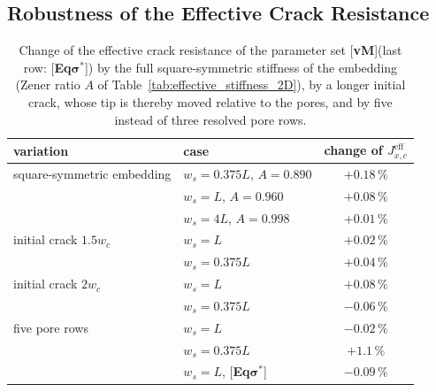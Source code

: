 \documentclass[pdflatex,sn-mathphys-num]{sn-jnl}%
\newcommand{\vMLabel}{[\textbf{vM}]\xspace}
\newcommand{\EqSigmaStarLabel}{[\textbf{Eq$\boldsymbol{\sigma^*}$}]\xspace}
\theoremstyle{thmstyleone}%
\theoremstyle{thmstyletwo}%
\theoremstyle{thmstylethree}%
\begin{document}
\subsection{Robustness of the Effective Crack Resistance}
\label{sec:2D_cubic_embedding}\label{sec:2D_representativity}

\begin{table}[htb]
\centering
\caption{Change of the effective crack resistance of the parameter set \vMLabel (last row: \EqSigmaStarLabel) by the full square-symmetric stiffness of the embedding (Zener ratio $A$ of Table~\ref{tab:effective_stiffness_2D}), by a longer initial crack, whose tip is thereby moved relative to the pores, and by five instead of three resolved pore rows.}
\label{tab:robustness_2D}
\begin{tabular}{llc}
\toprule
variation & case & change of $J_{x,c}^{\text{eff}}$ \\
\midrule
square-symmetric embedding & $w_s = 0.375L$, $A = 0.890$ & $+0.18\,\%$ \\
                           & $w_s = L$, $A = 0.960$      & $+0.08\,\%$ \\
                           & $w_s = 4L$, $A = 0.998$     & $+0.01\,\%$ \\
initial crack $1.5w_c$     & $w_s = L$                   & $+0.02\,\%$ \\
                           & $w_s = 0.375L$              & $+0.04\,\%$ \\
initial crack $2w_c$       & $w_s = L$                   & $+0.08\,\%$ \\
                           & $w_s = 0.375L$              & $-0.06\,\%$ \\
five pore rows             & $w_s = L$                   & $-0.02\,\%$ \\
                           & $w_s = 0.375L$              & $+1.1\,\%$ \\
                           & $w_s = L$, \EqSigmaStarLabel & $-0.09\,\%$ \\
\bottomrule
\end{tabular}
\end{table}
\end{document}
